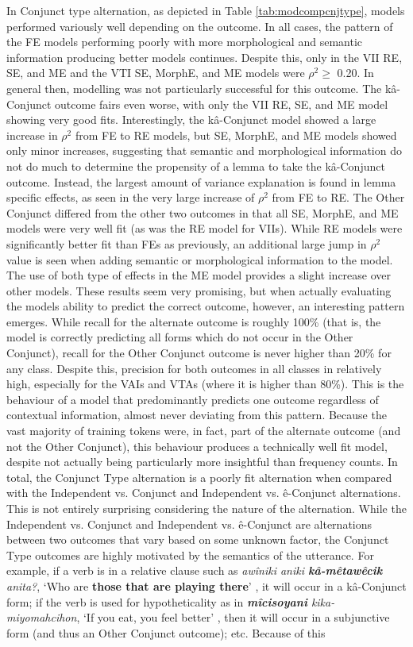     In Conjunct type alternation, as depicted in Table \ref{tab:modcompcnjtype}, models performed variously well depending on the outcome. In all cases, the pattern of the FE models performing poorly with more morphological and semantic information producing better models continues. Despite this, only in the  VII RE, SE, and ME and the VTI SE, MorphE, and ME models were $\rho^{2} \geq$ 0.20. In general then, modelling was not particularly successful for this outcome. The kâ-Conjunct outcome fairs even worse, with only the VII RE, SE, and ME model showing very good fits. Interestingly, the kâ-Conjunct model showed a large increase in $\rho^{2}$ from FE to RE models, but SE, MorphE, and ME models showed only minor increases, suggesting that semantic and morphological information do not do much to determine the propensity of a lemma to take the kâ-Conjunct outcome. Instead, the largest amount of variance explanation is found in lemma specific effects, as seen in the very large increase of $\rho^{2}$ from FE to RE. The Other Conjunct differed from the other two outcomes in that all SE, MorphE, and ME models were very well fit (as was the RE model for VIIs). While RE models were significantly better fit than FEs as previously, an additional large jump in $\rho^{2}$ value is seen when adding semantic or morphological information to the model. The use of both type of effects in the ME model provides a slight increase over other models. These results seem very promising, but when actually evaluating the models ability to predict the correct outcome, however, an interesting pattern emerges. While recall for the alternate outcome is roughly 100\% (that is, the model is correctly predicting all forms which do not occur in the Other Conjunct), recall for the Other Conjunct outcome is never higher than 20\% for any class. Despite this, precision for both outcomes in all classes in relatively high, especially for the VAIs and VTAs (where it is higher than 80\%). This is the behaviour of a model that predominantly predicts one outcome regardless of contextual information, almost never deviating from this pattern. Because the vast majority of training tokens were, in fact, part of the alternate outcome (and not the Other Conjunct), this behaviour produces a technically well fit model, despite not actually being particularly more insightful than frequency counts. In total, the Conjunct Type alternation is a poorly fit alternation when compared with the Independent vs. Conjunct and Independent vs. ê-Conjunct alternations. This is not entirely surprising considering the nature of the alternation. While the Independent vs. Conjunct and Independent vs. ê-Conjunct are alternations between two outcomes that vary based on some unknown factor, the Conjunct Type outcomes are highly motivated by the semantics of the utterance. For example, if a verb is in a relative clause such as  \textit{awîniki aniki \textbf{kâ-mêtawêcik} anita?}, `Who are \textbf{those that are playing there}' \citep[46]{okimasis2018cree}, it will occur in a kâ-Conjunct form; if the verb is used for hypotheticality as in \textit{\textbf{mîcisoyani} kika-miyomahcihon}, `If you eat, you feel better' \citep[64]{okimasis2018cree}, then it will occur in a subjunctive form (and thus an Other Conjunct outcome); etc. Because of this 